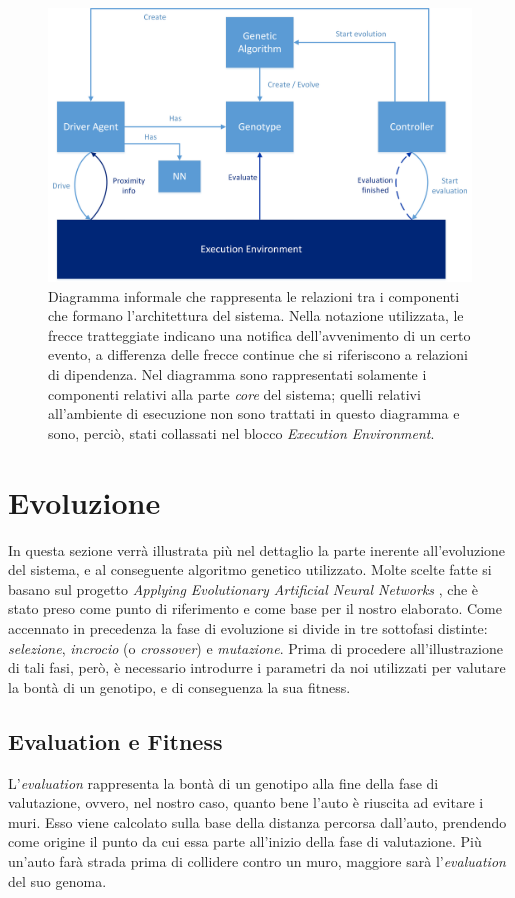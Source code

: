 \documentclass[a4paper,12pt]{article}
\begin{document}
\begin{figure}[H]
	\centering
	\includegraphics[width=130mm]{./img/architecture.png}
	\caption{Diagramma informale che rappresenta le relazioni tra i componenti che formano l'architettura del sistema. Nella notazione utilizzata, le frecce tratteggiate indicano una notifica dell'avvenimento di un certo evento, a differenza delle frecce continue che si riferiscono a relazioni di dipendenza. Nel diagramma sono rappresentati solamente i componenti relativi alla parte \emph{core} del sistema; quelli relativi all'ambiente di esecuzione non sono trattati in questo diagramma e sono, perciò, stati collassati nel blocco \emph{Execution Environment}.  \label{architecture-diagram}}
\end{figure}

\section{Evoluzione} \label{evolution}
In questa sezione verrà illustrata più nel dettaglio la parte inerente all'evoluzione del sistema, e al conseguente algoritmo genetico utilizzato. Molte scelte fatte si basano sul progetto \emph{Applying Evolutionary Artificial Neural Networks} \cite{arztRepo}, che è stato preso come punto di riferimento e come base per il nostro elaborato. Come accennato in precedenza la fase di evoluzione si divide in tre sottofasi distinte: \emph{selezione}, \emph{incrocio} (o \emph{crossover}) e \emph{mutazione}. Prima di procedere all'illustrazione di tali fasi, però, è necessario introdurre i parametri da noi utilizzati per valutare la bontà di un genotipo, e di conseguenza la sua fitness.
\subsection{Evaluation e Fitness} \label{evFitness}
L'\emph{evaluation} rappresenta la bontà di un genotipo alla fine della fase di valutazione, ovvero, nel nostro caso, quanto bene l'auto è riuscita ad evitare i muri. Esso viene calcolato sulla base della distanza percorsa dall'auto, prendendo come origine il punto da cui essa parte all'inizio della fase di valutazione. Più un'auto farà strada prima di collidere contro un muro, maggiore sarà l'\emph{evaluation} del suo genoma. 
\end{document}
